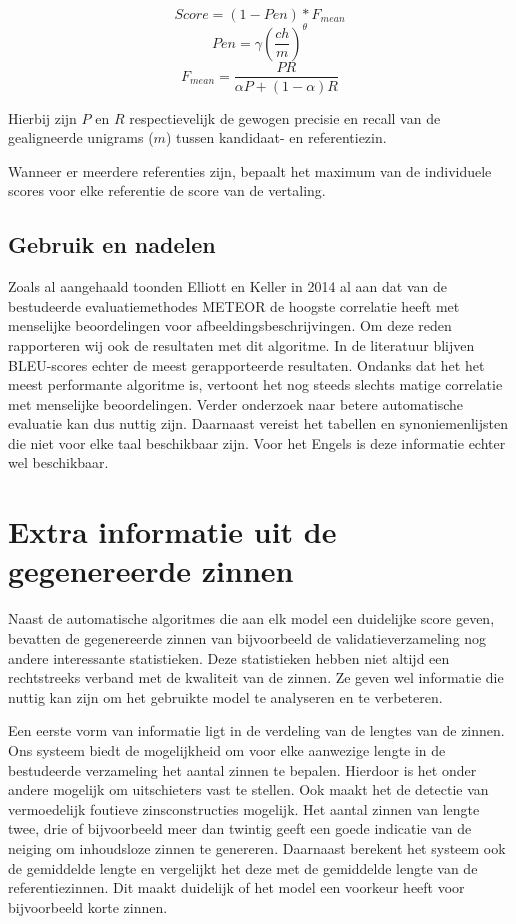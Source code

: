 \begin{equation}
Score = (1 - Pen)*F_{mean}
\end{equation} 
\begin{equation}
Pen = \gamma (\frac{ch}{m})^\theta
\end{equation}
\begin{equation}
F_{mean} = \frac{PR}{\alpha P + (1- \alpha)R}
\end{equation}

Hierbij zijn $P$ en $R$ respectievelijk de gewogen precisie en recall van de gealigneerde unigrams ($m$) tussen kandidaat- en referentiezin.

Wanneer er meerdere referenties zijn, bepaalt het maximum van de individuele scores voor elke referentie de score van de vertaling.

\subsection{Gebruik en nadelen}
Zoals al aangehaald toonden Elliott en Keller in 2014 al aan dat van de bestudeerde evaluatiemethodes METEOR de hoogste correlatie heeft met menselijke beoordelingen voor afbeeldingsbeschrijvingen. Om deze reden rapporteren wij ook de resultaten met dit algoritme. In de literatuur blijven BLEU-scores echter de meest gerapporteerde resultaten.
Ondanks dat het het meest performante algoritme is, vertoont het nog steeds slechts matige correlatie met menselijke beoordelingen. Verder onderzoek naar betere automatische evaluatie kan dus nuttig zijn. Daarnaast vereist het tabellen en synoniemenlijsten die niet voor elke taal beschikbaar zijn. Voor het Engels is deze informatie echter wel beschikbaar. 


\section{Extra informatie uit de gegenereerde zinnen}
Naast de automatische algoritmes die aan elk model een duidelijke score geven, bevatten de gegenereerde zinnen van bijvoorbeeld de validatieverzameling nog andere interessante statistieken. Deze statistieken hebben niet altijd een rechtstreeks verband met de kwaliteit van de zinnen. Ze geven wel informatie die nuttig kan zijn om het gebruikte model te analyseren en te verbeteren.

Een eerste vorm van informatie ligt in de verdeling van de lengtes van de zinnen. Ons systeem biedt de mogelijkheid om voor elke aanwezige lengte in de bestudeerde verzameling het aantal zinnen te bepalen. Hierdoor is het onder andere mogelijk om uitschieters vast te stellen. Ook maakt het de detectie van vermoedelijk foutieve zinsconstructies mogelijk. Het aantal zinnen van lengte twee, drie of bijvoorbeeld meer dan twintig geeft een goede indicatie van de neiging om inhoudsloze zinnen te genereren. Daarnaast berekent het systeem ook de gemiddelde lengte en vergelijkt het deze met de gemiddelde lengte van de referentiezinnen. Dit maakt duidelijk of het model een voorkeur heeft voor bijvoorbeeld korte zinnen.

